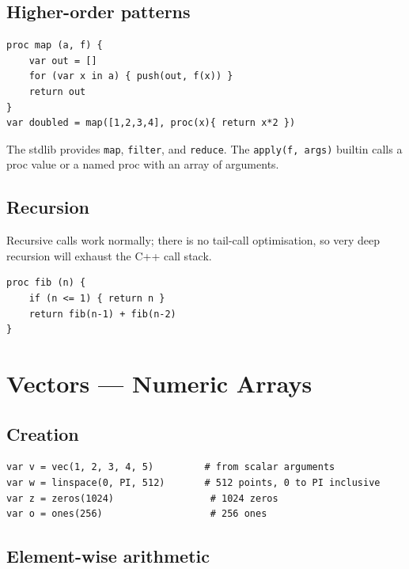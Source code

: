 \documentclass[11pt,a4paper]{article}
\newcommand{\musil}[1]{\lstinline[style=musilinline]{#1}}
\begin{document}
\subsection{Higher-order patterns}

\begin{lstlisting}
proc map (a, f) {
    var out = []
    for (var x in a) { push(out, f(x)) }
    return out
}
var doubled = map([1,2,3,4], proc(x){ return x*2 })
\end{lstlisting}

The stdlib provides \musil{map}, \musil{filter}, and \musil{reduce}. The
\musil{apply(f, args)} builtin calls a proc value or a named proc with an array
of arguments.

\subsection{Recursion}

Recursive calls work normally; there is no tail-call optimisation, so very
deep recursion will exhaust the C++ call stack.

\begin{lstlisting}
proc fib (n) {
    if (n <= 1) { return n }
    return fib(n-1) + fib(n-2)
}
\end{lstlisting}

\section{Vectors — Numeric Arrays}
\label{sec:vectors}

\subsection{Creation}

\begin{lstlisting}
var v = vec(1, 2, 3, 4, 5)         # from scalar arguments
var w = linspace(0, PI, 512)       # 512 points, 0 to PI inclusive
var z = zeros(1024)                 # 1024 zeros
var o = ones(256)                   # 256 ones
\end{lstlisting}

\subsection{Element-wise arithmetic}
\end{document}
